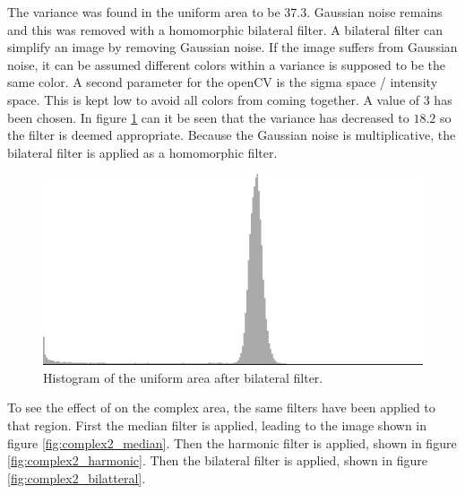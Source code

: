 The variance was found in the uniform area to be $37.3$.
Gaussian noise remains and this was removed with a homomorphic bilateral filter.
A bilateral filter can simplify an image by removing Gaussian noise.
If the image suffers from Gaussian noise, it can be assumed different colors within a variance is supposed to be the same color.
A second parameter for the openCV is the sigma space / intensity space. 
This is kept low to avoid all colors from coming together. 
A value of 3 has been chosen.
In figure \ref{fig:hist2_bilateral} can it be seen that the variance has decreased to $18.2$ so the filter is deemed appropriate.
Because the Gaussian noise is multiplicative, the bilateral filter is applied as a homomorphic filter.

\begin{figure}[H]
\centering
\includegraphics[width = \histogramWidth]{graphics/hist2_after_bilatteral.png}
\caption{Histogram of the uniform area after bilateral filter.}
\label{fig:hist2_bilateral}
\end{figure}

To see the effect of on the complex area, the same filters have been applied to that region.
First the median filter is applied, leading to the image shown in figure \ref{fig:complex2_median}.
Then the harmonic filter is applied, shown in figure \ref{fig:complex2_harmonic}.
Then the bilateral filter is applied, shown in figure \ref{fig:complex2_bilatteral}.

